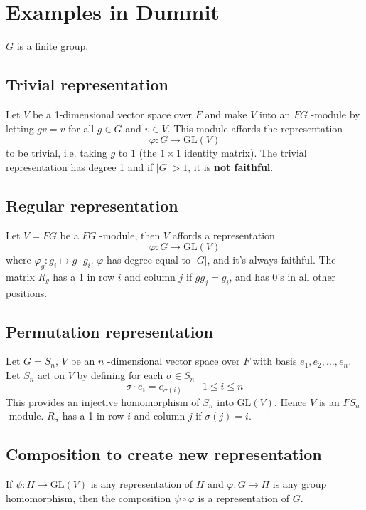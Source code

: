 \section{Examples in Dummit}

$G$ is a finite group.

\subsection{Trivial representation}

Let $V$ be a 1-dimensional vector space over $F$ and make $V$ into an $FG$ -module by letting $gv=v$ for all $g\in G$ and $v\in V$. This module affords the representation
\[
\varphi :G\to \mathrm{GL}(V)
\]
to be trivial, i.e. taking $g$ to $1$ (the $1\times1$ identity matrix). The trivial representation has degree 1 and if $\lvert G \rvert>1$, it is \textbf{not faithful}.

\subsection{Regular representation}

Let $V=FG$ be a $FG$ -module, then $V$ affords a representation
\[
\varphi:G\to \mathrm{GL}(V)
\]
where $\varphi_{g}:g_i\mapsto g\cdot g_i$. $\varphi$ has degree equal to $\lvert G \rvert$, and it's always faithful. The matrix $R_{g}$ has a 1 in row $i$ and column $j$ if $gg_j=g_i$, and has 0's in all other positions.

\subsection{Permutation representation}

Let $G=S_n$, $V$ be an $n$ -dimensional vector space over $F$ with basis $e_1,e_2,\dots,e_n$. Let $S_n$ act on $V$ by defining for each $\sigma\in S_n$
\[
\sigma \cdot e_i=e_{\sigma(i)}\qquad 1\leq i\leq n
\]
This provides an \underline{injective} homomorphism of $S_n$ into $\mathrm{GL}(V)$. Hence $V$ is an $FS_n$ -module. $R_{\sigma}$ has a 1 in row $i$ and column $j$ if $\sigma(j)=i$.

\subsection{Composition to create new representation}

If $\psi :H\to \mathrm{GL}(V)$ is any representation of $H$ and $\varphi:G\to H$ is any group homomorphism, then the composition $\psi \circ \varphi$ is a representation of $G$.

